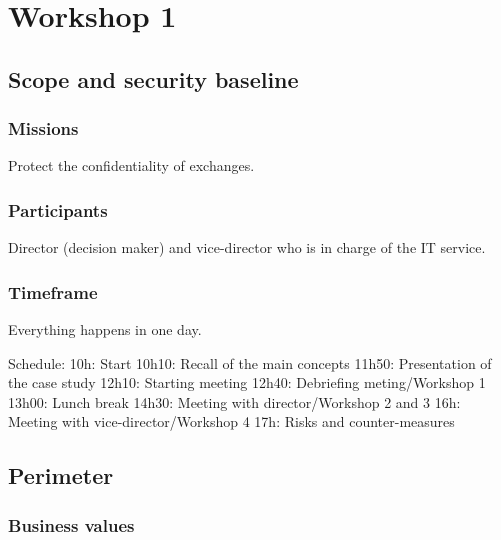 \hypertarget{Workshopux201}{%
\section{Workshop 1}\label{Workshopux201}}

\hypertarget{Scopeux20andux20securityux20baseline}{%
\subsection{Scope and security
baseline}\label{Scopeux20andux20securityux20baseline}}

\hypertarget{Missions}{%
\subsubsection{Missions}\label{Missions}}

Protect the confidentiality of exchanges.

\hypertarget{Participants}{%
\subsubsection{Participants}\label{Participants}}

Director (decision maker) and vice-director who is in charge of the IT
service.

\hypertarget{Timeframe}{%
\subsubsection{Timeframe}\label{Timeframe}}

Everything happens in one day.

Schedule: 10h: Start 10h10: Recall of the main concepts 11h50:
Presentation of the case study 12h10: Starting meeting 12h40: Debriefing
meting/Workshop 1 13h00: Lunch break 14h30: Meeting with
director/Workshop 2 and 3 16h: Meeting with vice-director/Workshop 4
17h: Risks and counter-measures

\hypertarget{Perimeter}{%
\subsection{Perimeter}\label{Perimeter}}

\hypertarget{Businessux20values}{%
\subsubsection{Business values}\label{Businessux20values}}

